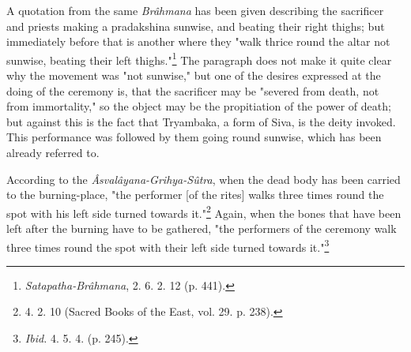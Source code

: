 \documentclass[a4paper, 11pt, oneside, polutonikogreek, english]{article}
\begin{document}
A quotation from the same \emph{Brâhmana} has been given describing the sacrificer and priests making a pradakshina sunwise, and beating their right thighs; but immediately before that is another where they "walk thrice round the altar not sunwise, beating their left thighs."\footnote{\emph{Satapatha-Brâhmana}, 2. 6. 2. 12 (p. 441).} The paragraph does not make it quite clear why the movement was "not sunwise," but one of the desires expressed at the doing of the ceremony is, that the sacrificer may be "severed from death, not from immortality," so the object may be the propitiation of the power of death; but against this is the fact that Tryambaka, a form of Siva, is the deity invoked. This performance was followed by them going round sunwise, which has been already referred to.

According to the \emph{Âsvalâyana-Grihya-Sûtra}, when the dead body has been carried to the burning-place, "the performer [of the rites] walks three times round the spot with his left side turned towards it."\footnote{4. 2. 10 (Sacred Books of the East, vol. 29. p. 238).} Again, when the bones that have been left after the burning have to be gathered, "the performers of the ceremony walk three times round the spot with their left side turned towards it."\footnote{\emph{Ibid.} 4. 5. 4. (p. 245).}
\end{document}
